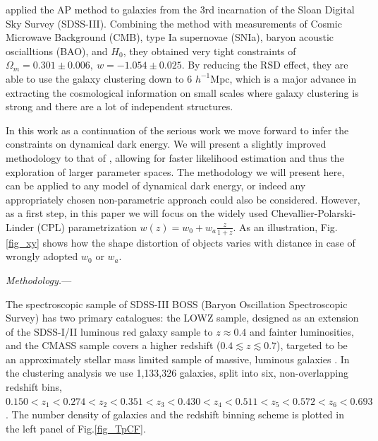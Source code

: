 \documentclass[prl,twocolumn,superscriptaddress,aps,amsmath,amssymb,nofootinbib,altaffilletter]{revtex4}
\begin{document}
\citep{Li2016} applied the AP method to galaxies from the 3rd incarnation of the Sloan Digital Sky Survey (SDSS-III).
Combining the method with measurements of Cosmic Microwave Background (CMB), type Ia supernovae (SNIa), 
baryon acoustic oscialltions (BAO), and $H_0$,
they obtained very tight constraints of $ \Omega_m = 0.301 \pm 0.006,\ w=-1.054 \pm 0.025$.
By reducing the RSD effect, 
they are able to use the galaxy clustering down to 6 $h^{-1}$Mpc,
which is a major advance in extracting the cosmological information 
on small scales where galaxy clustering is strong and there are a lot of independent structures.

In this work as a continuation of the serious work we move forward to infer the constraints on dynamical dark energy.
We will present a slightly improved methodology to that of \citep{Li2016}, 
allowing for faster likelihood estimation and thus the exploration of larger parameter spaces. 
The methodology we will present here, can be applied to any model of dynamical dark energy, 
or indeed any appropriately chosen non-parametric approach could also be considered. 
However, as a first step, in this paper we will focus on the widely used Chevallier-Polarski-Linder (CPL) parametrization
$w(z) = w_0 + w_a \frac{z}{1+z}$. 
As an illustration, Fig.\ref{fig_xy} shows how the shape distortion of objects varies with distance
in case of wrongly adopted $w_0$ or $w_a$.




{\it Methodology.}---


The spectroscopic sample of SDSS-III BOSS (Baryon Oscillation Spectroscopic Survey) has two primary catalogues:
the LOWZ sample, designed as an extension of the SDSS-I/II luminous red galaxy sample to $z\approx 0.4$ and fainter luminosities,
and the CMASS sample covers a higher redshift ($0.4\lesssim z \lesssim 0.7$),
targeted to be an approximately stellar mass limited sample of massive, luminous galaxies \cite{Reidetal:2016}.
In the clustering analysis we use 1,133,326 galaxies, split into six, non-overlapping redshift bins, 
$0.150<z_1<0.274<z_2<0.351<z_3<0.430<z_4<0.511<z_5<0.572<z_6<0.693$.
The number density of galaxies and the redshift binning scheme is plotted in the left panel of Fig.\ref{fig_TpCF}.
\end{document}
